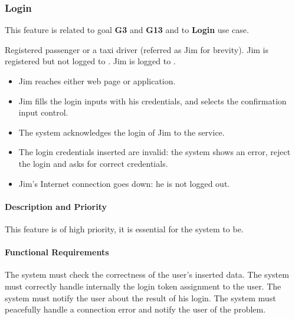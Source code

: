 \subsubsection{Login}
This feature is related to goal \textbf{G3} and \textbf{G13} and to \textbf{Login} use case.
\begin{itemize}
	 Registered passenger or a taxi driver (referred as Jim for brevity).
	 Jim is registered but not logged to \myTaxiService{}.
	 Jim is logged to \myTaxiService{}.
	\begin{itemize}
		\item Jim reaches either \myTaxiService{} web page or application.
		\item Jim fills the login inputs with his credentials, and selects the confirmation input control.
		\item The system acknowledges the login of Jim to the service.
	\end{itemize}
	\begin{itemize}
		\item The login credentials inserted are invalid: the system shows an error, reject the login and asks for correct credentials.
		\item Jim's Internet connection goes down: he is not logged out.
	\end{itemize}
\end{itemize}
\paragraph{Description and Priority}
This feature is of high priority, it is essential for the system to be.\par
\paragraph{Functional Requirements}
\begin{itemize}
	 The system must check the correctness of the user's inserted data.
	 The system must correctly handle internally the login token assignment to the user.
	 The system must notify the user about the result of his login.
	 The system must peacefully handle a connection error and notify the user of the problem.
\end{itemize}
